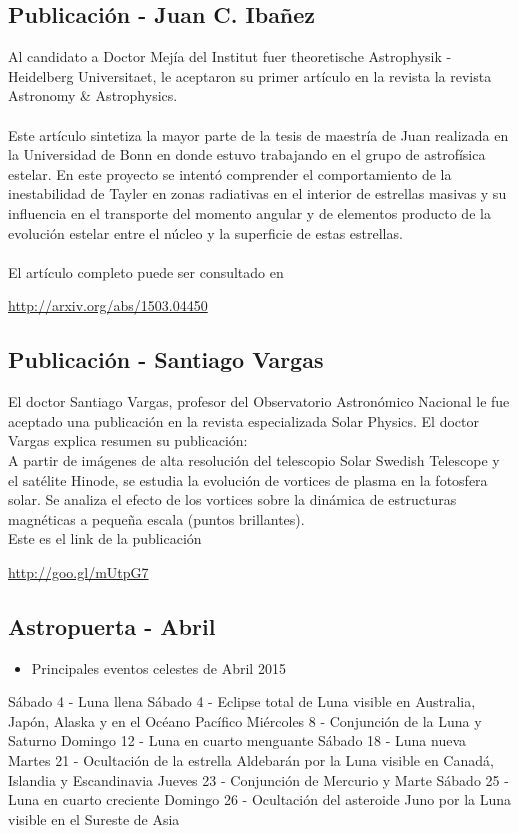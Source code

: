 \documentclass{book}
\begin{document}
\subsection{Publicación - Juan C. Ibañez}
Al candidato a Doctor  Mejía del Institut fuer theoretische Astrophysik - Heidelberg Universitaet, le aceptaron su primer artículo en la revista la revista Astronomy \& Astrophysics. \\
\\
Este artículo sintetiza la mayor parte de la tesis de maestría de Juan realizada en la Universidad de Bonn en donde estuvo trabajando en el grupo de astrofísica estelar. En este proyecto se intentó comprender el comportamiento de la inestabilidad de Tayler en zonas radiativas en el interior de estrellas masivas y su influencia en el transporte del momento angular y de elementos producto de la evolución estelar entre el núcleo y la superficie de estas estrellas.\\
\\
El artículo completo puede ser consultado en
\begin{center}
\url{http://arxiv.org/abs/1503.04450}
\end{center}

\subsection{Publicación - Santiago Vargas}
El doctor Santiago Vargas, profesor del Observatorio Astronómico Nacional le fue aceptado una publicación en la revista especializada Solar Physics. El doctor Vargas explica resumen su publicación:\\

A partir de imágenes de alta resolución del telescopio Solar Swedish Telescope y el satélite Hinode, se estudia la evolución de vortices de plasma en la fotosfera solar. Se analiza el efecto de los vortices sobre la dinámica de estructuras magnéticas a pequeña escala (puntos brillantes).\\

Este es el link de la publicación
\begin{center}
\url{http://goo.gl/mUtpG7}
\end{center}
\newpage
\subsection{Astropuerta - Abril}
\begin{itemize}
\item Principales eventos celestes de Abril 2015
\end{itemize}
Sábado 4 - Luna llena
Sábado 4 - Eclipse total de Luna visible en Australia, Japón, Alaska y en el Océano Pacífico
Miércoles 8 - Conjunción de la Luna y Saturno
Domingo 12 - Luna en cuarto menguante
Sábado 18 - Luna nueva
Martes 21 - Ocultación de la estrella Aldebarán por la Luna visible en Canadá, Islandia y Escandinavia
Jueves 23 - Conjunción de Mercurio y Marte
Sábado 25 - Luna en cuarto creciente
Domingo 26 - Ocultación del asteroide Juno por la Luna visible en el Sureste de Asia
\end{document}

